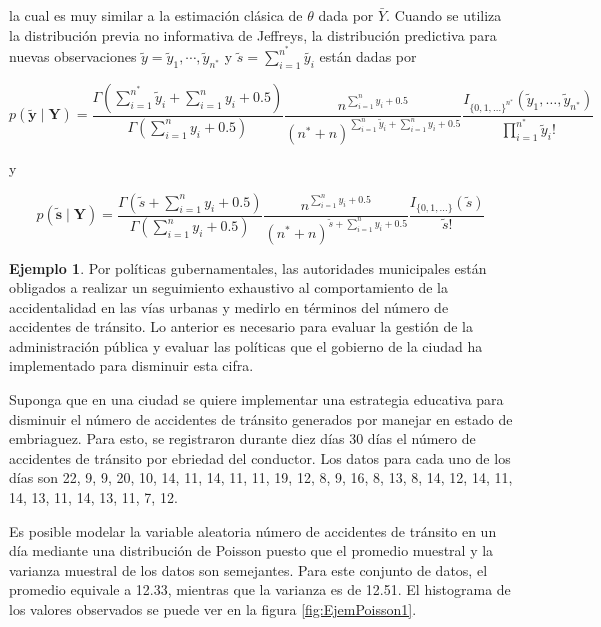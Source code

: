 \documentclass[
  12pt,
  spanish,
]{book}
\theoremstyle{definition}
\theoremstyle{definition}
\newtheorem{example}{Ejemplo}[chapter]
\theoremstyle{definition}
\theoremstyle{definition}
\theoremstyle{remark}
\begin{document}
la cual es muy similar a la estimación clásica de \(\theta\) dada por \(\bar{Y}\). Cuando se utiliza la distribución previa no informativa de Jeffreys, la distribución predictiva para nuevas observaciones \(\tilde{y}={\tilde{y}_1,\cdots,\tilde{y}_{n^*}}\) y \(\tilde{s}=\sum_{i=1}^{n^*}\tilde{y_i}\) están dadas por

\begin{equation}
\label{eq:PredPoissonJeffreys}
p(\tilde{\mathbf{y}} \mid \mathbf{Y})=\frac{\Gamma(\sum_{i=1}^{n^*}\tilde{y}_i+\sum_{i=1}^ny_i+0.5)}{\Gamma(\sum_{i=1}^ny_i+0.5)}
\frac{n^{\sum_{i=1}^ny_i+0.5}}{({n^*}+n)^{\sum_{i=1}^n\tilde{y}_i+\sum_{i=1}^ny_i+0.5}}
\frac{I_{\{0,1,\ldots\}^{n^*}}(\tilde{y}_1,\ldots,\tilde{y}_{n^*})}{\prod_{i=1}^{n^*}\tilde{y}_i!}
\end{equation}

y

\begin{equation}
\label{eq:Pred1PoissonJeffreys}
p(\tilde{\mathbf{s}} \mid \mathbf{Y})=\frac{\Gamma(\tilde{s}+\sum_{i=1}^ny_i+0.5)}{\Gamma(\sum_{i=1}^ny_i+0.5)}
\frac{n^{\sum_{i=1}^ny_i+0.5}}{({n^*}+n)^{\tilde{s}+\sum_{i=1}^ny_i+0.5}}\frac{I_{\{0,1,\ldots\}}(\tilde{s})}{\tilde{s}!}
\end{equation}

\begin{example}
\protect\hypertarget{exm:unnamed-chunk-48}{}{\label{exm:unnamed-chunk-48} }Por políticas gubernamentales, las autoridades municipales están obligados a realizar un seguimiento exhaustivo al comportamiento de la accidentalidad en las vías urbanas y medirlo en términos del número de accidentes de tránsito. Lo anterior es necesario para evaluar la gestión de la administración pública y evaluar las políticas que el gobierno de la ciudad ha implementado para disminuir esta cifra.

Suponga que en una ciudad se quiere implementar una estrategia educativa para disminuir el número de accidentes de tránsito generados por manejar en estado de embriaguez. Para esto, se registraron durante diez días 30 días el número de accidentes de tránsito por ebriedad del conductor. Los datos para cada uno de los días son 22, 9, 9, 20, 10, 14, 11, 14, 11, 11, 19, 12, 8, 9, 16, 8, 13, 8, 14, 12, 14, 11, 14, 13, 11, 14, 13, 11, 7, 12.

Es posible modelar la variable aleatoria número de accidentes de tránsito en un día mediante una distribución de Poisson puesto que el promedio muestral y la varianza muestral de los datos son semejantes. Para este conjunto de datos, el promedio equivale a 12.33, mientras que la varianza es de 12.51. El histograma de los valores observados se puede ver en la figura \ref{fig:EjemPoisson1}.
\end{example}
\end{document}
